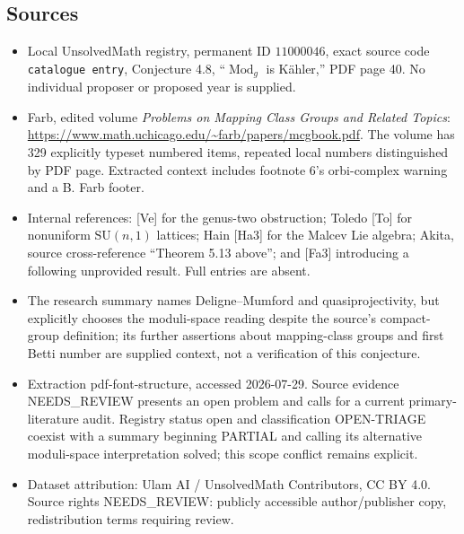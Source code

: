 \documentclass[11pt]{article}
\begin{document}
\subsection{Sources}
\begin{itemize}
\item Local UnsolvedMath registry, permanent ID \(11000046\), exact source code \texttt{catalogue entry}, Conjecture 4.8, ``\(\operatorname{Mod}_g\) is Kähler,'' PDF page 40. No individual proposer or proposed year is supplied.
\item Farb, edited volume \emph{Problems on Mapping Class Groups and Related Topics}: \url{https://www.math.uchicago.edu/~farb/papers/mcgbook.pdf}. The volume has 329 explicitly typeset numbered items, repeated local numbers distinguished by PDF page. Extracted context includes footnote 6's orbi-complex warning and a B. Farb footer.
\item Internal references: [Ve] for the genus-two obstruction; Toledo [To] for nonuniform \(\mathrm{SU}(n,1)\) lattices; Hain [Ha3] for the Malcev Lie algebra; Akita, source cross-reference ``Theorem 5.13 above''; and [Fa3] introducing a following unprovided result. Full entries are absent.
\item The research summary names Deligne--Mumford and quasiprojectivity, but explicitly chooses the moduli-space reading despite the source's compact-group definition; its further assertions about mapping-class groups and first Betti number are supplied context, not a verification of this conjecture.
\item Extraction pdf-font-structure, accessed 2026-07-29. Source evidence NEEDS\_REVIEW presents an open problem and calls for a current primary-literature audit. Registry status open and classification OPEN-TRIAGE coexist with a summary beginning PARTIAL and calling its alternative moduli-space interpretation solved; this scope conflict remains explicit.
\item Dataset attribution: Ulam AI / UnsolvedMath Contributors, CC BY 4.0. Source rights NEEDS\_REVIEW: publicly accessible author/publisher copy, redistribution terms requiring review.
\end{itemize}
\end{document}
